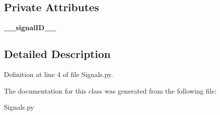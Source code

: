 \subsection*{Private Attributes}
\begin{DoxyCompactItemize}
\item 
{\bfseries \+\_\+\+\_\+signal\+I\+D\+\_\+\+\_\+}\hypertarget{classSignals_1_1SignalSource_a83c7d24dc35a94a5efaa2b6418b0f587}{}\label{classSignals_1_1SignalSource_a83c7d24dc35a94a5efaa2b6418b0f587}

\end{DoxyCompactItemize}


\subsection{Detailed Description}


Definition at line 4 of file Signals.\+py.



The documentation for this class was generated from the following file\+:\begin{DoxyCompactItemize}
\item 
Signals.\+py\end{DoxyCompactItemize}
